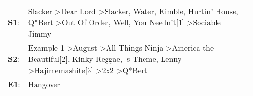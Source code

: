 \begin{supertabular}{p{0.03\textwidth}p{0.92\textwidth}}
 \textbf{S1}:  &                                  Slacker\textsuperscript{} \textgreater \enspace Dear Lord\textsuperscript{} \textgreater \enspace Slacker\textsuperscript{}, \enspace Water\textsuperscript{}, \enspace Kimble\textsuperscript{}, \enspace Hurtin' House\textsuperscript{}, \enspace Q*Bert\textsuperscript{} \textgreater \enspace Out Of Order\textsuperscript{}, \enspace Well, You Needn't[1]\textsuperscript{} \textgreater \enspace Sociable Jimmy\textsuperscript{}  \enspace  \\
 \textbf{S2}:  &  Example 1\textsuperscript{} \textgreater \enspace August\textsuperscript{} \textgreater \enspace All Things Ninja\textsuperscript{} \textgreater \enspace America the Beautiful[2]\textsuperscript{}, \enspace Kinky Reggae\textsuperscript{}, 's Theme\textsuperscript{}, \enspace Lenny\textsuperscript{} \textgreater \enspace Hajimemashite[3]\textsuperscript{} \textgreater \enspace 2x2\textsuperscript{} \textgreater \enspace Q*Bert\textsuperscript{}  \enspace  \\
 \textbf{E1}:  &                                                                                                                                                                                                                                                                                                                                                                                                                                                  Hangover\textsuperscript{}  \enspace  \\
\end{supertabular}
